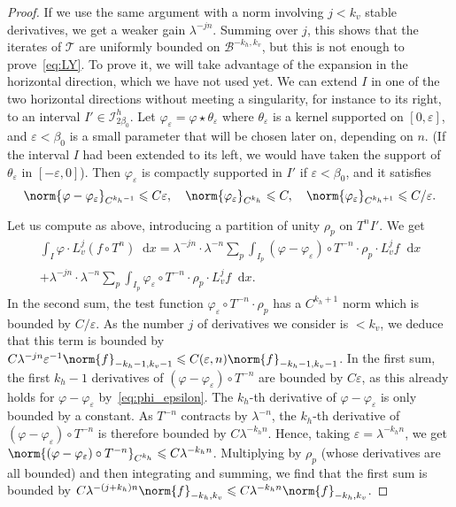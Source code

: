 \documentclass[11pt, a4paper, oneside, final, pagebackref]{amsart}
\newcommand{\boI}{\mathcal{I}}
\newcommand{\boB}{\mathcal{B}}
\newcommand{\boT}{\mathcal{T}}
\newcommand{\dd}{\mathop{}\!\mathrm{d}}
\renewcommand{\epsilon}{\varepsilon}
\renewcommand{\phi}{\varphi}
\renewcommand{\leq}{\leqslant}
\theoremstyle{definition}
\numberwithin{equation}{section}
\begin{document}
\begin{proof}
If we use the same argument with a norm involving $j < k_v$ stable
derivatives, we get a weaker gain $\lambda^{-jn}$. Summing over $j$, this
shows that the iterates of $\boT$ are uniformly bounded on $\boB^{-k_h,
k_v}$, but this is not enough to prove~\eqref{eq:LY}. To prove it, we will
take advantage of the expansion in the horizontal direction, which we have
not used yet. We can extend $I$ in one of the two horizontal directions
without meeting a singularity, for instance to its right, to an interval $I'
\in \boI^h_{2\beta_0}$. Let  $\phi_\epsilon = \phi \star \theta_\epsilon$
where $\theta_\epsilon$ is a kernel supported on $[0,\epsilon]$, and
$\epsilon<\beta_0$ is a small parameter that will be chosen later on,
depending on $n$. (If the interval $I$ had been extended to its left, we
would have taken the support of $\theta_\epsilon$ in $[-\epsilon, 0]$). Then
$\phi_\epsilon$ is compactly supported in $I'$ if $\epsilon<\beta_0$, and it
satisfies
\begin{equation}
  \label{eq:phi_epsilon}
  \norm{\phi-\phi_\epsilon}_{C^{k_h-1}} \leq C \epsilon,\quad
  \norm{\phi_\epsilon}_{C^{k_h}} \leq C, \quad
  \norm{\phi_\epsilon}_{C^{k_h+1}} \leq C/\epsilon.
\end{equation}

Let us compute as above, introducing a partition of unity $\rho_p$ on $T^n
I'$. We get
\begin{multline*}
  \int_I \phi \cdot L_v^j(f \circ T^n) \dd x
  = \lambda^{-jn} \cdot \lambda^{-n} \sum_p \int_{I_p} (\phi-\phi_\epsilon) \circ T^{-n} \cdot \rho_p \cdot L_v^j f \dd x
  \\ + \lambda^{-jn} \cdot \lambda^{-n} \sum_p \int_{I_p} \phi_\epsilon \circ T^{-n} \cdot \rho_p \cdot L_v^j f \dd x.
\end{multline*}
In the second sum, the test function $\phi_\epsilon \circ T^{-n} \cdot
\rho_p$ has a $C^{k_h+1}$ norm which is bounded by $C/\epsilon$. As the
number $j$ of derivatives we consider is $<k_v$, we deduce that this term is
bounded by $C \lambda^{-jn} \epsilon^{-1} \norm{f}_{-k_h-1, k_v-1} \leq
C(\epsilon, n) \norm{f}_{-k_h-1, k_v-1}$. In the first sum, the first $k_h-1$
derivatives of $(\phi-\phi_\epsilon) \circ T^{-n}$ are bounded by
$C\epsilon$, as this already holds for $\phi-\phi_\epsilon$
by~\eqref{eq:phi_epsilon}. The $k_h$-th derivative of $\phi-\phi_\epsilon$ is
only bounded by a constant. As $T^{-n}$ contracts by $\lambda^{-n}$, the
$k_h$-th derivative of $(\phi-\phi_\epsilon) \circ T^{-n}$ is therefore
bounded by $C \lambda^{-k_h n}$. Hence, taking $\epsilon = \lambda^{-k_h n}$,
we get $\norm{(\phi-\phi_\epsilon) \circ T^{-n}}_{C^{k_h}} \leq C
\lambda^{-k_h n}$. Multiplying by $\rho_p$ (whose derivatives are all
bounded) and then integrating and summing, we find that the first sum is
bounded by $C \lambda^{-(j+k_h)n} \norm{f}_{-k_h, k_v} \leq C \lambda^{-k_h
n} \norm{f}_{-k_h, k_v}$.


\end{proof}
\end{document}
